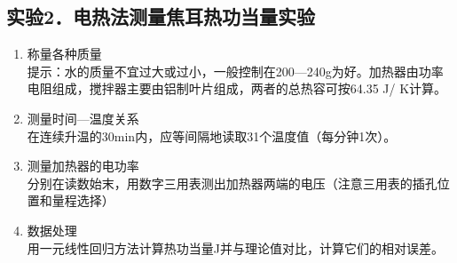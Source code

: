 \documentclass[11pt,a4paper,oneside]{article}
\begin{document}
\subsection*{实验2．电热法测量焦耳热功当量实验}
\begin{enumerate}
\item  称量各种质量\\
提示：水的质量不宜过大或过小，一般控制在200—240g为好。加热器由功率电阻组成，搅拌器主要由铝制叶片组成，两者的总热容可按64.35 J/ K计算。
\item  测量时间—温度关系\\
 在连续升温的30min内，应等间隔地读取31个温度值（每分钟1次）。
\item  测量加热器的电功率\\
分别在读数始末，用数字三用表测出加热器两端的电压（注意三用表的插孔位置和量程选择）
\item  数据处理\\
用一元线性回归方法计算热功当量J并与理论值对比，计算它们的相对误差。
\end{enumerate}
\end{document}
